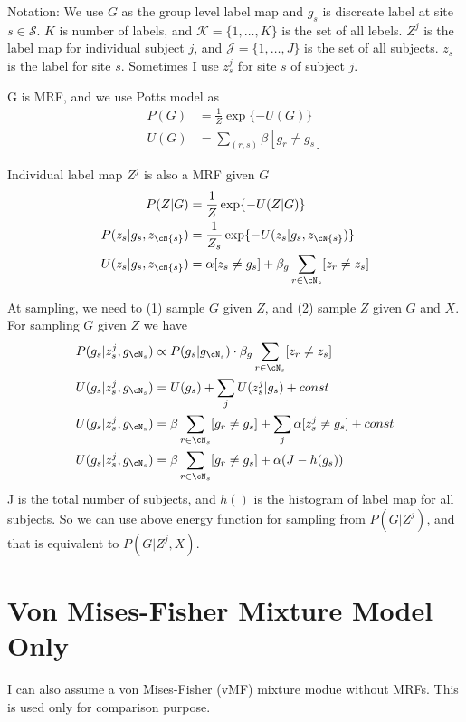 \documentclass{article}
\begin{document}
Notation: We use $G$ as the group level label map and $g_s$ is discreate label at site $s \in \mathcal{S}$. $K$ is number of labels, and $\mathcal{K} = \{1, \dots, K\}$ is the set of all lebels.  $Z^j$ is the label map for individual subject $j$, and $\mathcal{J} = \{1, \dots, J \}$ is the set of all subjects. $z_s$ is the label for site $s$. Sometimes I use $z_s^j$ for site $s$ of subject $j$. 

G is MRF, and we use Potts model as
\begin{align*}
  P(G) &= \frac{1}{Z}\exp \{ -U(G)\}\\
  U(G) &= \sum_{(r,s)} \beta [g_r \neq g_s]
\end{align*}

Individual label map $Z^j$ is also a MRF given $G$
\begin{align*}
  P(Z|G) &= \frac{1}{Z}\exp \{ -U(Z|G)\}\\
  P(z_s | g_s, z_{\cN{s}}) &= \frac{1}{Z_s} \exp \{ -U(z_s | g_s,  z_{\cN{s}})\} \\
  U(z_s | g_s,  z_{\cN{s}}) &= \alpha[z_s \neq g_s] + \beta_g \sum_{r\in \cN_s}[z_r \neq z_s]
\end{align*}

At sampling, we need to (1) sample $G$ given $Z$, and (2) sample $Z$ given $G$ and $X$. For sampling $G$ given $Z$ we have
\begin{align*}
  P(g_s|z_s^j, g_{\cN_s}) &\propto P(g_s | g_{\cN_s}) \cdot \beta_g \sum_{r\in\cN_s}[z_r \neq z_s]\\
  U(g_s | z_s^j, g_{\cN_s} ) &= U(g_s) + \sum_j U(z_s^j | g_s) + const\\
  U(g_s | z_s^j, g_{\cN_s} ) &= \beta \sum_{r\in\cN_s} [g_r\neq g_s] + \sum_j \alpha [z_s^j \neq g_s] + const \\
  U(g_s|z_s^j, g_{\cN_s}) &= \beta \sum_{r\in\cN_s} [g_r\neq g_s] + \alpha (J - h(g_s) )
\end{align*}
J is the total number of subjects, and $h()$ is the histogram of label map for all subjects. So we can use above energy function for sampling from $P(G|Z^j)$, and that is equivalent to $P(G|Z^j, X)$.

\section{Von Mises-Fisher Mixture Model Only}
I can also assume a von Mises-Fisher (vMF) mixture modue without MRFs. This is used only for comparison purpose. 
\end{document}
